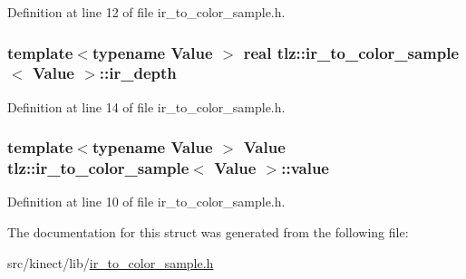 Definition at line 12 of file ir\+\_\+to\+\_\+color\+\_\+sample.\+h.

\subsubsection[{\texorpdfstring{ir\+\_\+depth}{ir_depth}}]{\setlength{\rightskip}{0pt plus 5cm}template$<$typename Value $>$ {\bf real} {\bf tlz\+::ir\+\_\+to\+\_\+color\+\_\+sample}$<$ Value $>$\+::ir\+\_\+depth}\hypertarget{structtlz_1_1ir__to__color__sample_a702120f1e4d631a23b62b7d56607b49c}{}\label{structtlz_1_1ir__to__color__sample_a702120f1e4d631a23b62b7d56607b49c}


Definition at line 14 of file ir\+\_\+to\+\_\+color\+\_\+sample.\+h.

\subsubsection[{\texorpdfstring{value}{value}}]{\setlength{\rightskip}{0pt plus 5cm}template$<$typename Value $>$ Value {\bf tlz\+::ir\+\_\+to\+\_\+color\+\_\+sample}$<$ Value $>$\+::value}\hypertarget{structtlz_1_1ir__to__color__sample_a8c2eaf0c1dfbd3a6ddaf35482f92df30}{}\label{structtlz_1_1ir__to__color__sample_a8c2eaf0c1dfbd3a6ddaf35482f92df30}


Definition at line 10 of file ir\+\_\+to\+\_\+color\+\_\+sample.\+h.



The documentation for this struct was generated from the following file\+:\begin{DoxyCompactItemize}
\item 
src/kinect/lib/\hyperlink{ir__to__color__sample_8h}{ir\+\_\+to\+\_\+color\+\_\+sample.\+h}\end{DoxyCompactItemize}

